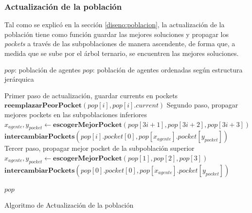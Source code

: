 \subsubsection{Actualización de la población}
Tal como se explicó en la sección \ref{diseno:poblacion}, la actualización de la población tiene como función guardar las mejores soluciones y propagar los \textit{pockets} a través de las subpoblaciones de manera ascendente, de forma que, a medida que se sube por el árbol ternario, se encuentren las mejores soluciones.
\\[25pt] 
\begin{algorithm}[H]
	\begin{algorithmic}[1]
		\REQUIRE $pop$: población de agentes
		\ENSURE $pop$: población de agentes ordenadas según estructura jerárquica

		\STATE \COMMENT Primer paso de actualización, guardar currents en pockets
			\STATE $\textbf{reemplazarPeorPocket}(pop[i],pop[i].current)$
		\ENDFOR
		\STATE
		\STATE \COMMENT Segundo paso, propagar mejores pockets en las subpoblaciones inferiores
			\STATE $x_{agente},y_{pocket} \gets \textbf{escogerMejorPocket}(pop[3i+1],pop[3i+2],pop[3i+3])$
				\STATE $\textbf{intercambiarPockets}( pop[i].pocket[0], pop[x_{agente}].pocket[y_{pocket}])$
			\ENDIF
		\ENDFOR
		\STATE
		\STATE \COMMENT Tercer paso, propagar mejor pocket de la subpoblación superior
		\STATE $x_{agente},y_{pocket} \gets \textbf{escogerMejorPocket}(pop[1],pop[2],pop[3])$
			\STATE $\textbf{intercambiarPockets}( pop[0].pocket[0], pop[x_{agente}].pocket[y_{pocket}])$
		\ENDIF
		
		\RETURN $pop$
	\end{algorithmic}
	\caption{Algoritmo de Actualización de la población}
	\label{alg:memetico-updatepop}
\end{algorithm}

